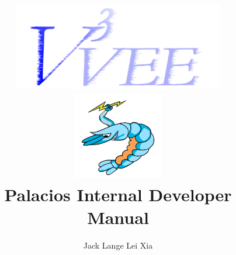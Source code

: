 \documentclass[11pt]{article}
\begin{document}
\title{
\includegraphics[height=1.5in]{v3vee.pdf}
\includegraphics[height=1.5in]{palacios.pdf} \\
\vspace{0.5in} 
Palacios Internal Developer Manual
}
\author{Jack Lange \hspace{0.5in} Lei Xia}
\end{document}
